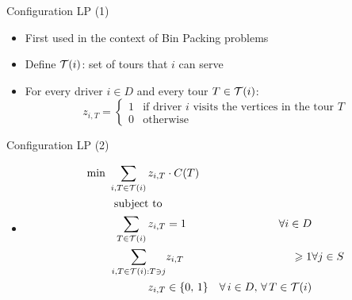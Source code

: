 \begin{frame}[t]{Configuration LP (1)}
    \begin{itemize}
        \item<1-> First used in the context of Bin Packing problems
        \item<2-> Define $\mathcal{T}(i)$: set of tours that $i$ can serve        
        \item<3-> For every driver $i \in D$ and every tour $T \in \mathcal{T}(i)$:
        \[
            z_{i, T} =
                \begin{cases}
                    1 & \text{if driver $i$ visits the vertices in the tour $T$} \\
                    0 & \text{otherwise}
                \end{cases}
        \]
    \end{itemize}
\end{frame}
\begin{frame}[t]{Configuration LP (2)}
    \label{CLP2}
    \begin{itemize}
        \item<1->[ ] \begin{align}
            \text {min } \label{cg_obj}	 \sum_{ i, 	T \in \mathcal{T}(i) } z_{i, T} & \cdot C(T) &    &  \\
            \text{subject to }             & & \nonumber  \\
            \label{const:cg1}       \sum_{ T \in \mathcal{T}(i) } z_{ i, T } & = 1  &   \forall i \in D \\
            \label{const:cg2}       \sum_{ i, T \in \mathcal{T}(i): T \ni j } & z_{ i, T } & \geqslant 1   &   \forall j \in S \\
            \label{consT:cg3}       z_{ i, T } & \in \{0,\, 1\}    & \forall \, i \in D, \, \forall \, T \in \mathcal{T}(i) 
        \end{align}        
        \hyperlink{our_method_bp}{}
    \end{itemize}
\end{frame}

